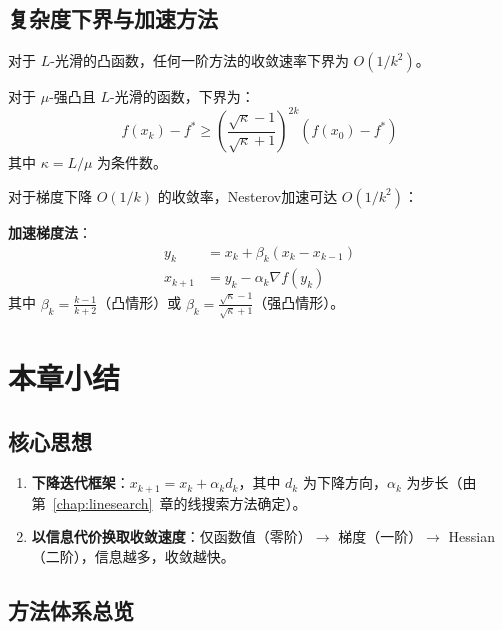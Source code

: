 \subsection{复杂度下界与加速方法}

\begin{theorem}[一阶方法的复杂度下界]
对于 $L$-光滑的凸函数，任何一阶方法的收敛速率下界为 $O(1/k^2)$。

对于 $\mu$-强凸且 $L$-光滑的函数，下界为：
\[
f(x_k) - f^* \geq \left(\frac{\sqrt{\kappa} - 1}{\sqrt{\kappa} + 1}\right)^{2k} (f(x_0) - f^*)
\]
其中 $\kappa = L/\mu$ 为条件数。
\end{theorem}

\begin{notebox}[Nesterov加速梯度法]
对于梯度下降 $O(1/k)$ 的收敛率，Nesterov加速可达 $O(1/k^2)$：

\textbf{加速梯度法}：
\begin{align*}
y_k &= x_k + \beta_k(x_k - x_{k-1}) \\
x_{k+1} &= y_k - \alpha_k \nabla f(y_k)
\end{align*}
其中 $\beta_k = \frac{k-1}{k+2}$（凸情形）或 $\beta_k = \frac{\sqrt{\kappa} - 1}{\sqrt{\kappa} + 1}$（强凸情形）。
\end{notebox}

\section{本章小结}\label{sec:ch5-summary}

\subsection{核心思想}

\begin{conceptbox}[多维无约束优化的两大支柱]
\begin{enumerate}[label=\arabic*., leftmargin=2em]
    \item \textbf{下降迭代框架}：$x_{k+1} = x_k + \alpha_k d_k$，其中 $d_k$ 为下降方向，$\alpha_k$ 为步长（由第~\ref{chap:linesearch}~章的线搜索方法确定）。
    \item \textbf{以信息代价换取收敛速度}：仅函数值（零阶）$\rightarrow$ 梯度（一阶）$\rightarrow$ Hessian（二阶），信息越多，收敛越快。
\end{enumerate}
\end{conceptbox}

\subsection{方法体系总览}

